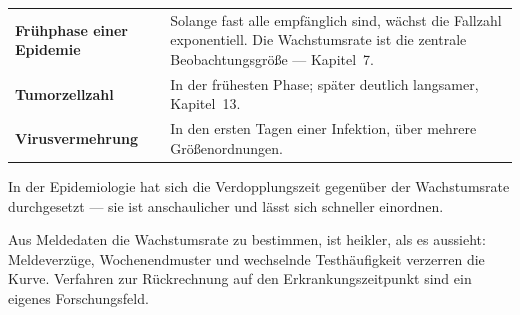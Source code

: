 \begin{forschung}
\begin{center}
{\small
\renewcommand{\arraystretch}{1.45}
\begin{tabular}{@{}P{3.0cm}P{5.2cm}@{}}
\toprule
\textbf{Frühphase einer Epidemie} & Solange fast alle empfänglich sind, wächst die Fallzahl exponentiell. Die Wachstumsrate ist die zentrale Beobachtungsgröße --- Kapitel~7.\\
\textbf{Tumorzellzahl} & In der frühesten Phase; später deutlich langsamer, Kapitel~13.\\
\textbf{Virus\-vermehrung} & In den ersten Tagen einer Infektion, über mehrere Größenordnungen.\\
\bottomrule
\end{tabular}}
\end{center}

In der Epidemiologie hat sich die Verdopplungszeit gegenüber der Wachstumsrate durchgesetzt --- sie ist anschaulicher und lässt sich schneller einordnen.

\begin{center}
\begin{minipage}{0.88\textwidth}
\end{minipage}
\end{center}

Aus Meldedaten die Wachstumsrate zu bestimmen, ist heikler, als es aussieht: Meldeverzüge, Wochenendmuster und wechselnde Testhäufigkeit verzerren die Kurve. Verfahren zur Rückrechnung auf den Erkrankungszeitpunkt sind ein eigenes Forschungsfeld.

\begin{center}
\begin{minipage}{0.88\textwidth}
\end{minipage}
\end{center}
\end{forschung}

